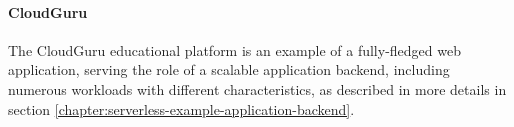 



\paragraph{CloudGuru} \label{chapter:serverless-suitability-cloudguru}

The CloudGuru educational platform is an example of a fully-fledged web application, serving the role of a scalable application backend, including numerous workloads with different characteristics, as described in more details in section \ref{chapter:serverless-example-application-backend}.

